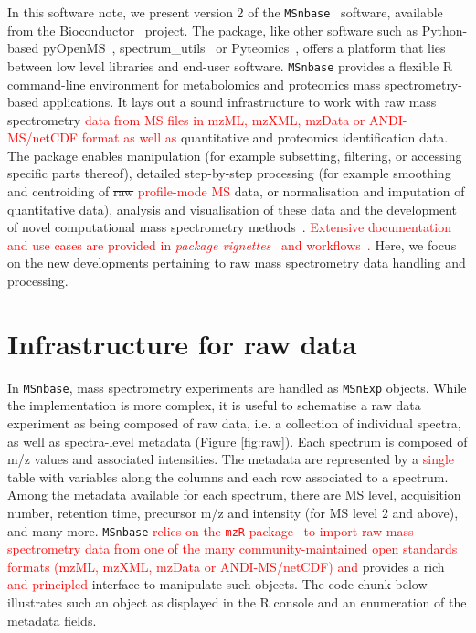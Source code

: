 \documentclass[journal=jacsat,manuscript=article]{achemso}\usepackage[]{graphicx}\usepackage[]{color}
\begin{document}
In this software note, we present version 2 of the
\texttt{MSnbase}~\cite{Gatto:2012} software, available from the
Bioconductor~\cite{Huber:2015} project. The package, like other
software such as Python-based {pyOpenMS}~\cite{Rost:2014},
spectrum\_utils~\cite{Bittremieux:2020} or
Pyteomics~\cite{Goloborodko:2013}, offers a platform that lies between
low level libraries and end-user software. \texttt{MSnbase} provides a
flexible R~\cite{R} command-line environment for metabolomics and
proteomics mass spectrometry-based applications. It lays out a sound
infrastructure to work with raw mass spectrometry \textcolor{red}{data
  from MS files in mzML, mzXML, mzData or ANDI-MS/netCDF format as
  well as} quantitative and proteomics identification data. The
package enables manipulation (for example subsetting, filtering, or
accessing specific parts thereof), detailed step-by-step processing
(for example smoothing and centroiding of \sout{raw}
\textcolor{red}{profile-mode MS} data, or normalisation and imputation
of quantitative data), analysis and visualisation of these data and
the development of novel computational mass spectrometry
methods~\cite{Stanstrup:2019}. \textcolor{red}{Extensive documentation
  and use cases are provided in \textit{package
    vignettes}~\cite{MSnbaseVignettes} and
  workflows~\cite{xcmsWorkflow}.} Here, we focus on the new
developments pertaining to raw mass spectrometry data handling and
processing.

\section{Infrastructure for raw data}

In \texttt{MSnbase}, mass spectrometry experiments are handled as
\texttt{MSnExp} objects. While the implementation is more complex, it
is useful to schematise a raw data experiment as being composed of raw
data, i.e. a collection of individual spectra, as well as
spectra-level metadata (Figure \ref{fig:raw}). Each spectrum is
composed of m/z values and associated intensities. The metadata are
represented by a \textcolor{red}{single} table with variables along
the columns and each row associated to a spectrum. Among the metadata
available for each spectrum, there are MS level, acquisition number,
retention time, precursor m/z and intensity (for MS level 2 and
above), and many more. \texttt{MSnbase} \textcolor{red}{relies on the
  \texttt{mzR} package~\cite{Chambers:2012} to import raw mass
  spectrometry data from one of the many community-maintained open
  standards formats (mzML, mzXML, mzData or ANDI-MS/netCDF) and}
provides a rich \textcolor{red}{and principled} interface to
manipulate such objects. The code chunk below illustrates such an
object as displayed in the R console and an enumeration of the
metadata fields.
\end{document}
